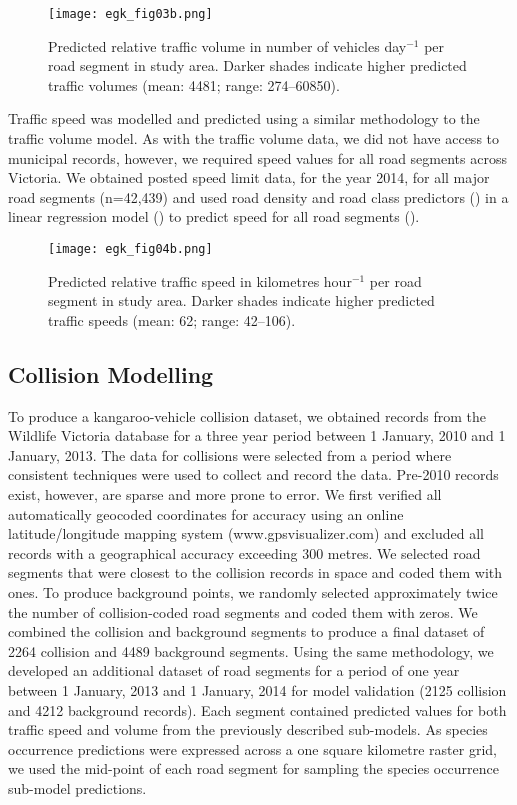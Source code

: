 \begin{figure*}[!h]
  \centering
  \texttt{[image: egk\_fig03b.png]}
  \caption[Predicted relative traffic volume in Victoria]{Predicted relative traffic volume in number of vehicles day$^{-1}$ per road segment in study area. Darker shades indicate higher predicted traffic volumes (mean: 4481; range: 274--60850).}
  \label{egk_tvolmap}
\end{figure*}

Traffic speed was modelled and predicted using a similar methodology to the traffic volume model. As with the traffic volume data, we did not have access to municipal records, however, we required speed values for all road segments across Victoria. We obtained posted speed limit data, for the year 2014, for all major road segments (n=42,439) and used road density and road class predictors () in a linear regression model () to predict speed for all road segments (). 

\begin{figure*}[!h]
  \centering
  \texttt{[image: egk\_fig04b.png]}
  \caption[Predicted relative traffic speed in Victoria]{Predicted relative traffic speed in kilometres hour$^{-1}$ per road segment in study area. Darker shades indicate higher predicted traffic speeds (mean: 62; range: 42--106).}
  \label{egk_tspdmap}
\end{figure*}

\subsection{Collision Modelling}

To produce a kangaroo-vehicle collision dataset, we obtained records from the Wildlife Victoria database for a three year period between 1 January, 2010 and 1 January, 2013. The data for collisions were selected from a period where consistent techniques were used to collect and record the data.  Pre-2010 records exist, however, are sparse and more prone to error.  We first verified all automatically geocoded coordinates for accuracy using an online latitude/longitude mapping system (www.gpsvisualizer.com) and excluded all records with a geographical accuracy exceeding 300 metres. We selected road segments that were closest to the collision records in space and coded them with ones. To produce background points, we randomly selected approximately twice the number of collision-coded road segments and coded them with zeros. We combined the collision and background segments to produce a final dataset of 2264 collision and 4489 background segments. Using the same methodology, we developed an additional dataset of road segments for a period of one year between 1 January, 2013 and 1 January, 2014 for model validation (2125 collision and 4212 background records). Each segment contained predicted values for both traffic speed and volume from the previously described sub-models. As species occurrence predictions were expressed across a one square kilometre raster grid, we used the mid-point of each road segment for sampling the species occurrence sub-model predictions.

